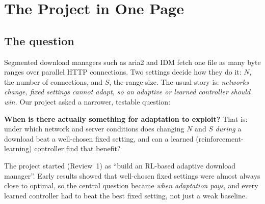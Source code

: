 \chapter{The Project in One Page}\label{ch:overview}

\section{The question}
Segmented download managers such as aria2 and IDM fetch one file as many byte ranges over parallel HTTP connections. Two settings decide how they do it: $N$, the number of connections, and $S$, the range size. The usual story is: \emph{networks change, fixed settings cannot adapt, so an adaptive or learned controller should win.} Our project asked a narrower, testable question:

\begin{keyidea}
\textbf{When is there actually something for adaptation to exploit?} That is: under which network and server conditions does changing $N$ and $S$ \emph{during} a download beat a well-chosen fixed setting, and can a learned (reinforcement-learning) controller find that benefit?
\end{keyidea}

The project started (Review~1) as ``build an RL-based adaptive download manager''. Early results showed that well-chosen fixed settings were almost always close to optimal, so the central question became \emph{when adaptation pays}, and every learned controller had to beat the best fixed setting, not just a weak baseline.

